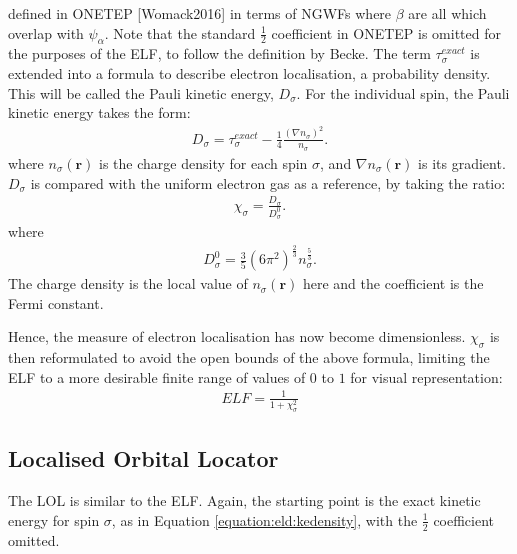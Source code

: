 \documentclass[letterpaper,10pt,english]{sphinxmanual}
\begin{document}
defined in ONETEP {[}Womack2016{]} in terms of NGWFs
where \(\beta\) are all which overlap with \(\psi_{\alpha}\).
Note that the standard \(\frac{1}{2}\) coefficient in ONETEP is
omitted for the purposes of the ELF, to follow the definition by Becke.
The term \(\tau_{\sigma}^{exact}\) is extended into a formula to
describe electron localisation, a  probability density.
This will be called the Pauli kinetic energy, \(D_{\sigma}\). For
the individual spin, the Pauli kinetic energy takes the form:
\begin{equation*}
\begin{split}D_{\sigma} = \tau_{\sigma}^{exact} - \frac{1}{4} \frac{\left( \nabla n_{\sigma} \right) ^{2}} {n_{\sigma}}.\end{split}
\end{equation*}
where \(n_{\sigma}(\textbf{r})\) is the charge density for each
spin \(\sigma\), and \(\nabla n_{\sigma}(\textbf{r})\) is its
gradient. \(D_{\sigma}\) is compared with the uniform electron gas
as a reference, by taking the ratio:
\begin{equation*}
\begin{split}\chi_{\sigma} = \frac {D_{\sigma}} {D_{\sigma}^{0}}.\end{split}
\end{equation*}
where
\begin{equation*}
\begin{split}D_{\sigma}^{0} = \frac{3}{5} \left( 6\pi^{2} \right) ^{\frac{2}{3}} n_{\sigma}^{\frac{5}{3}}.\end{split}
\end{equation*}
The charge density is the local value of
\(n_{\sigma} \left( \textbf{r} \right)\) here and the coefficient is
the Fermi constant.

Hence, the measure of electron localisation has now become
dimensionless. \(\chi_{\sigma}\) is then reformulated to avoid the
open bounds of the above formula, limiting the ELF to a more desirable
finite range of values of \(0\) to \(1\) for visual
representation:
\begin{equation*}
\begin{split}ELF = \frac{1}{1+\chi_{\sigma}^{2}}\end{split}
\end{equation*}

\subsection{Localised Orbital Locator}
\label{\detokenize{eld:localised-orbital-locator}}
The LOL is similar to the ELF. Again, the starting point is the exact
kinetic energy for spin \(\sigma\), as in Equation \eqref{equation:eld:kedensity},
with the \(\frac{1}{2}\) coefficient omitted.
\end{document}

